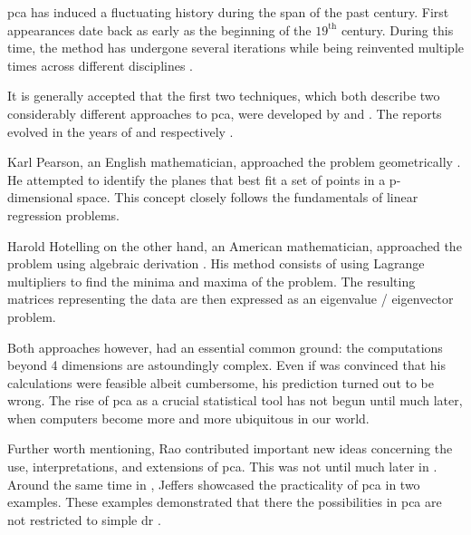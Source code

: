 \Gls{pca} has induced a fluctuating history during the span of the past century.
First appearances date back as early as the beginning of the $19^{\text{th}}$ century. 
During this time, the method has undergone several iterations while being reinvented multiple times across different disciplines \cite{jolliffe2016principal}.\bigskip


It is generally accepted that the first two techniques, which both describe two considerably different approaches to \gls{pca}, were developed by \citeauthor{pearson1901liii} and \citeauthor{hotelling1933analysis}. 
The reports evolved in the years of \citeyear{pearson1901liii} and \citeyear{hotelling1933analysis} respectively \cite{Jolliffe2002book}.

Karl Pearson, an English mathematician, approached the problem geometrically \cite{pearson1901liii}.
He attempted to identify the planes that best fit a set of points in a p-dimensional space.
This concept closely follows the fundamentals of linear regression problems.

Harold Hotelling on the other hand, an American mathematician, approached the problem using algebraic derivation \cite{hotelling1933analysis}.
His method consists of using Lagrange multipliers to find the minima and maxima of the problem.
The resulting matrices representing the data are then expressed as an eigenvalue / eigenvector problem.\medskip


Both approaches however, had an essential common ground: the computations beyond 4 dimensions are astoundingly complex.
Even if \citeauthor{pearson1901liii} was convinced that his calculations were feasible albeit cumbersome, his prediction turned out to be wrong.
The rise of \gls{pca} as a crucial statistical tool has not begun until much later, when computers become more and more ubiquitous in our world.\bigskip


Further worth mentioning, Rao \cite{rao1964use} contributed important new ideas concerning the use, interpretations, and extensions of \gls{pca}.
This was not until much later in \citeyear{rao1964use}.
Around the same time in \citeyear{jeffers1967two}, Jeffers \cite{jeffers1967two} showcased the practicality of \gls{pca} in two examples. 
These examples demonstrated that there the possibilities in \gls{pca} are not restricted to simple \acrlong{dr} \cite{Jolliffe2002book}.



